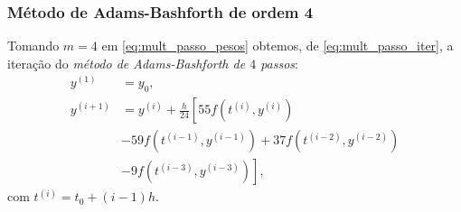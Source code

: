 \subsubsection{Método de Adams-Bashforth de ordem 4}

Tomando $m=4$ em \eqref{eq:mult_passo_pesos} obtemos, de \eqref{eq:mult_passo_iter}, a iteração do \emph{método de Adams-Bashforth de $4$ passos}:
\begin{align}
  y^{(1)} &= y_0,\\
  y^{(i+1)} &= y^{(i)} + \frac{h}{24}\left[55f(t^{(i)},y^{(i)}) \right.\nonumber\\
              &\left. - 59f(t^{(i-1)},y^{(i-1)}) + 37f(t^{(i-2)},y^{(i-2)}) \right. \nonumber \\
          &\left. -9f(t^{(i-3)},y^{(i-3)})\right],
\end{align}
com $t^{(i)} = t_0 + (i-1)h$.

